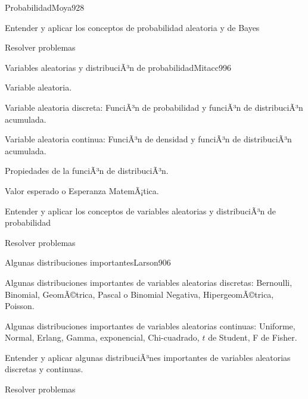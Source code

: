 \begin{syllabus}
\begin{unit}{Probabilidad}{Moya92}{8}
   \begin{unitgoals}
         \item  Entender y aplicar los conceptos de probabilidad aleatoria y de Bayes
         \item  Resolver problemas
   \end{unitgoals}
\end{unit}

\begin{unit}{Variables aleatorias y distribuciÃ³n de probabilidad}{Mitacc99}{6}
   \begin{topics}
         \item  Variable aleatoria.
	 \item  Variable aleatoria discreta: FunciÃ³n de probabilidad y funciÃ³n de distribuciÃ³n acumulada.
         \item  Variable aleatoria continua: FunciÃ³n de densidad y funciÃ³n de distribuciÃ³n acumulada.
	 \item  Propiedades de la funciÃ³n de distribuciÃ³n.
         \item  Valor esperado o Esperanza MatemÃ¡tica.
   \end{topics}

   \begin{unitgoals}
         \item  Entender y aplicar los conceptos de variables aleatorias y  distribuciÃ³n de probabilidad
         \item  Resolver problemas
   \end{unitgoals}
\end{unit}

\begin{unit}{Algunas distribuciones importantes}{Larson90}{6}
   \begin{topics}
         \item  Algunas distribuciones importantes de variables aleatorias discretas: Bernoulli, Binomial,  GeomÃ©trica, Pascal o Binomial Negativa, HipergeomÃ©trica, Poisson.
	 \item  Algunas distribuciones importantes de variables aleatorias continuas: Uniforme, Normal, Erlang, Gamma, exponencial, Chi-cuadrado, $t$ de Student, F de Fisher.
   \end{topics}

   \begin{unitgoals}
         \item  Entender y aplicar algunas distribuciÃ³nes importantes de variables aleatorias discretas y continuas.
         \item  Resolver problemas
   \end{unitgoals}
\end{unit}


\end{syllabus}
